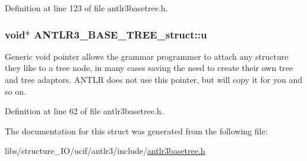 Definition at line 123 of file antlr3basetree.\-h.

\hypertarget{struct_a_n_t_l_r3___b_a_s_e___t_r_e_e__struct_a72f24e689b5faf745271636b43207d0b}{
\subsubsection[{u}]{\setlength{\rightskip}{0pt plus 5cm}void$\ast$ A\-N\-T\-L\-R3\-\_\-\-B\-A\-S\-E\-\_\-\-T\-R\-E\-E\-\_\-struct\-::u}}\label{struct_a_n_t_l_r3___b_a_s_e___t_r_e_e__struct_a72f24e689b5faf745271636b43207d0b}
Generic void pointer allows the grammar programmer to attach any structure they like to a tree node, in many cases saving the need to create their own tree and tree adaptors. A\-N\-T\-L\-R does not use this pointer, but will copy it for you and so on. 

Definition at line 62 of file antlr3basetree.\-h.



The documentation for this struct was generated from the following file\-:\begin{DoxyCompactItemize}
\item 
libs/structure\-\_\-\-I\-O/ucif/antlr3/include/\hyperlink{antlr3basetree_8h}{antlr3basetree.\-h}\end{DoxyCompactItemize}
